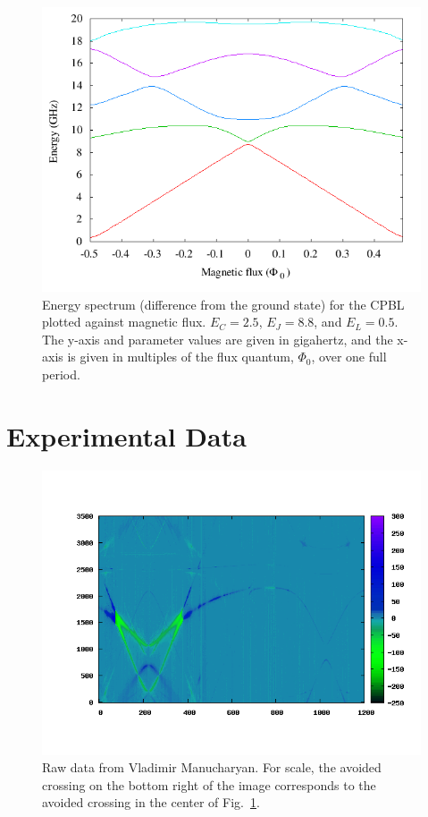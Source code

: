 \documentclass[twocolumn]{revtex4}
\begin{document}
\begin{figure} 
\includegraphics[width=\linewidth]{CPBL-theory.png}
\caption{ Energy spectrum (difference from the ground state) for the
  CPBL plotted against magnetic flux. $E_C=2.5$, $E_J=8.8$, and
  $E_L=0.5$. The y-axis and parameter values are given in gigahertz,
  and the x-axis is given in multiples of the flux quantum, $\Phi_0$,
  over one full period.}
\label{cpbl-theory}
\end{figure}

\section{Experimental Data}
\begin{figure}
\includegraphics[width=\linewidth]{CPBL-color.png}
\caption{ Raw data from Vladimir Manucharyan. For scale, the avoided
  crossing on the bottom right of the image corresponds to the avoided
  crossing in the center of Fig.~\ref{cpbl-theory}. }
\label{raw}
\end{figure}
\end{document}

